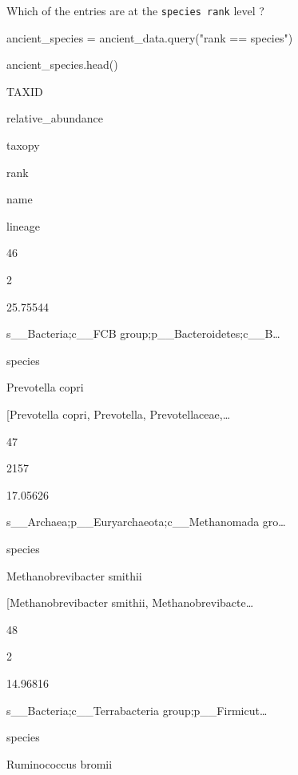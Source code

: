 \documentclass[
  letterpaper,
]{book}
\newenvironment{Shaded}{}{}
\newcommand{\NormalTok}[1]{\textcolor[rgb]{0.14,0.16,0.18}{#1}}
\newcommand{\OperatorTok}[1]{\textcolor[rgb]{0.14,0.16,0.18}{#1}}
\newcommand{\StringTok}[1]{\textcolor[rgb]{0.01,0.18,0.38}{#1}}
\begin{document}
Which of the entries are at the \texttt{species\ rank} level ?

\begin{Shaded}
\begin{Highlighting}[]
\NormalTok{ancient\_species }\OperatorTok{=}\NormalTok{ ancient\_data.query(}\StringTok{"rank == \textquotesingle{}species\textquotesingle{}"}\NormalTok{)}
\end{Highlighting}
\end{Shaded}

\begin{Shaded}
\begin{Highlighting}[]
\NormalTok{ancient\_species.head()}
\end{Highlighting}
\end{Shaded}

TAXID

relative\_abundance

taxopy

rank

name

lineage

46

2

25.75544

s\_\_Bacteria;c\_\_FCB group;p\_\_Bacteroidetes;c\_\_B\ldots{}

species

Prevotella copri

{[}Prevotella copri, Prevotella, Prevotellaceae,\ldots{}

47

2157

17.05626

s\_\_Archaea;p\_\_Euryarchaeota;c\_\_Methanomada gro\ldots{}

species

Methanobrevibacter smithii

{[}Methanobrevibacter smithii, Methanobrevibacte\ldots{}

48

2

14.96816

s\_\_Bacteria;c\_\_Terrabacteria group;p\_\_Firmicut\ldots{}

species

Ruminococcus bromii
\end{document}
